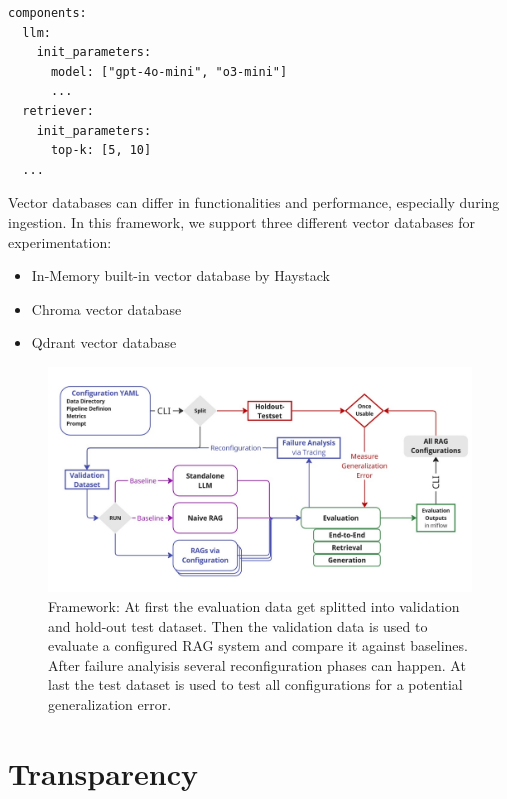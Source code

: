 \begin{verbatim}
components:
  llm:
    init_parameters:
      model: ["gpt-4o-mini", "o3-mini"]
      ...
  retriever:
    init_parameters:
      top-k: [5, 10]
  ...
\end{verbatim}


Vector databases can differ in functionalities and performance, especially during ingestion. In this framework, we support three different vector databases for experimentation:
\begin{itemize}
  \item In-Memory built-in vector database by Haystack
  \item Chroma vector database\cite{Chroma}
  \item Qdrant vector database\cite{qdrant}
\end{itemize}


\begin{figure}[h]
  \centering
  \includegraphics[width=\textwidth]{images/FrameworkFull.pdf}
  \caption{Framework: At first the evaluation data get splitted into validation and hold-out test dataset. Then the validation data is used to evaluate a configured RAG system and compare it against baselines. After failure analyisis several reconfiguration phases can happen. At last the test dataset is used to test all configurations for a potential generalization error.}
  \label{fig:framework-full}
\end{figure}


\section{Transparency}

